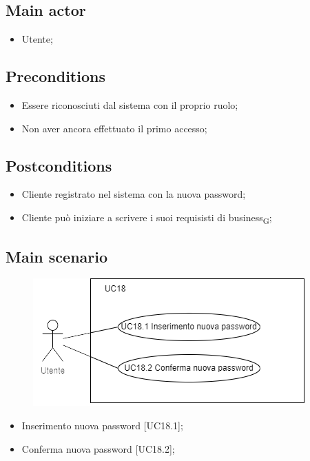 \documentclass{article}
\begin{document}
\subsection*{Main actor}
        \begin{itemize}
            \item Utente;
        \end{itemize}
        
    \subsection*{Preconditions}
        \begin{itemize}
            \item Essere riconosciuti dal sistema con il proprio ruolo;
            \item Non aver ancora effettuato il primo accesso;
        \end{itemize}
        
    \subsection*{Postconditions}
        \begin{itemize}
            \item Cliente registrato nel sistema con la nuova password;
            \item Cliente può iniziare a scrivere i suoi requisisti di business\textsubscript{G};
        \end{itemize}
     \subsection*{Main scenario}
        \begin{figure}[h]
          \centering
          \includegraphics{./imgUML/UC18-zoom.png}
          \label{fig:immagine}
        \end{figure}
        
        \begin{itemize}
            \item Inserimento nuova password [UC18.1];
            \item Conferma nuova password [UC18.2];
        \end{itemize}
\end{document}
